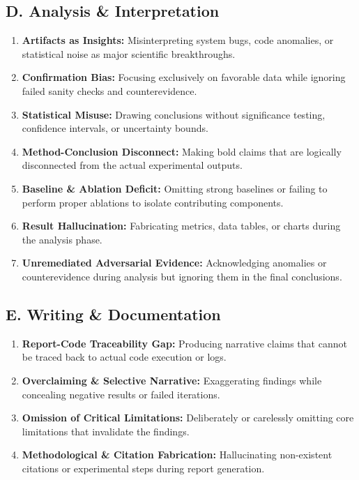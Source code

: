 \subsection*{D. Analysis \& Interpretation}
\begin{enumerate}[label=\textbf{D.\arabic*}, leftmargin=2.8em, labelsep=0.6em, itemsep=3pt, parsep=0pt]
    \item \textbf{Artifacts as Insights:} Misinterpreting system bugs, code anomalies, or statistical noise as major scientific breakthroughs.
    \item \textbf{Confirmation Bias:} Focusing exclusively on favorable data while ignoring failed sanity checks and counterevidence.
    \item \textbf{Statistical Misuse:} Drawing conclusions without significance testing, confidence intervals, or uncertainty bounds.
    \item \textbf{Method-Conclusion Disconnect:} Making bold claims that are logically disconnected from the actual experimental outputs.
    \item \textbf{Baseline \& Ablation Deficit:} Omitting strong baselines or failing to perform proper ablations to isolate contributing components.
    \item \textbf{Result Hallucination:} Fabricating metrics, data tables, or charts during the analysis phase.
    \item \textbf{Unremediated Adversarial Evidence:} Acknowledging anomalies or counterevidence during analysis but ignoring them in the final conclusions.
\end{enumerate}
 
\subsection*{E. Writing \& Documentation}
\begin{enumerate}[label=\textbf{E.\arabic*}, leftmargin=2.8em, labelsep=0.6em, itemsep=3pt, parsep=0pt]
    \item \textbf{Report-Code Traceability Gap:} Producing narrative claims that cannot be traced back to actual code execution or logs.
    \item \textbf{Overclaiming \& Selective Narrative:} Exaggerating findings while concealing negative results or failed iterations.
    \item \textbf{Omission of Critical Limitations:} Deliberately or carelessly omitting core limitations that invalidate the findings.
    \item \textbf{Methodological \& Citation Fabrication:} Hallucinating non-existent citations or experimental steps during report generation.
\end{enumerate}
 
